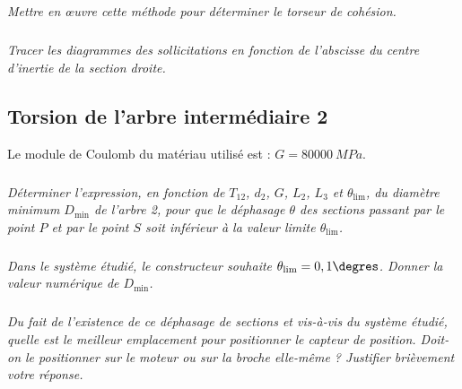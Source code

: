 \documentclass[10pt,fleqn]{article} %
\begin{document}
\begin{multicols}{2}
\subparagraph{}\textit{Mettre en \oe{}uvre cette méthode pour déterminer le torseur de cohésion.}

\subparagraph{}\textit{Tracer les diagrammes des sollicitations en fonction de l'abscisse du centre d'inertie de la section droite.}

\subsection*{Torsion de l’arbre intermédiaire 2}

Le module de Coulomb du matériau utilisé est : $G = \SI{80000}{MPa}$.

\subparagraph{}\textit{Déterminer l’expression, en fonction de $T_{12}$, $d_2$, $G$, $L_2$, $L_3$ et $\theta_{\text{lim}}$, du diamètre minimum $D_{\text{min}}$ de l’arbre 2, pour que le déphasage $\theta$ des sections passant par le point
$P$ et par le point $S$ soit inférieur à la valeur limite $\theta_{\text{lim}}$.}

\subparagraph{}\textit{Dans le système étudié, le constructeur souhaite $\theta_{\text{lim}}=0,1\degres$. Donner la valeur
numérique de $D_{\text{min}}$.}

\subparagraph{}\textit{Du fait de l’existence de ce déphasage de sections et vis-à-vis du système étudié, quelle
est le meilleur emplacement pour positionner le capteur de position. Doit-on le positionner
sur le moteur ou sur la broche elle-même ? Justifier brièvement votre réponse.}


\end{multicols}
\end{document}
